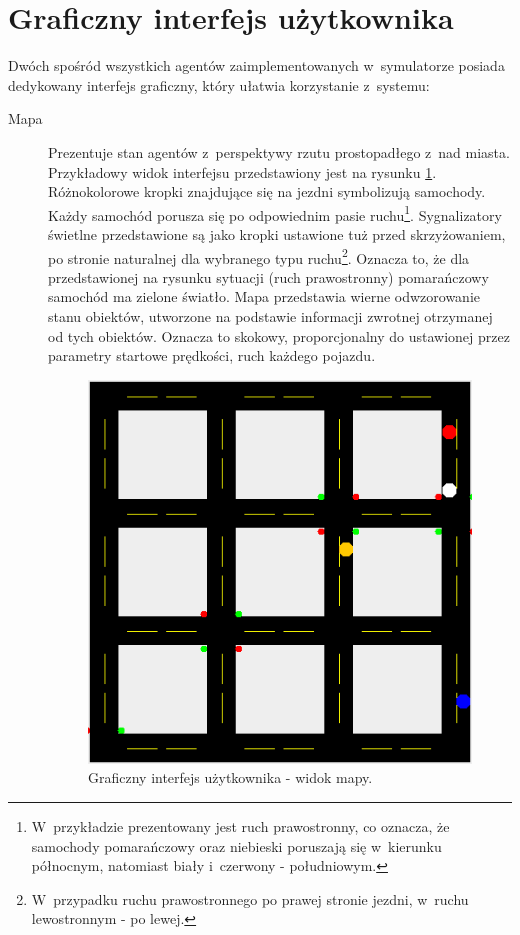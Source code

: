 \documentclass[a4paper,11pt]{article}
\begin{document}
\section{Graficzny interfejs użytkownika}

Dwóch spośród wszystkich agentów zaimplementowanych w~symulatorze posiada dedykowany interfejs graficzny, który ułatwia korzystanie z~systemu:

\begin{description}
    \item[Mapa] Prezentuje stan agentów z~perspektywy rzutu prostopadłego z~nad miasta. Przykładowy widok interfejsu przedstawiony jest na rysunku \ref{img:map}. Różnokolorowe kropki znajdujące się na jezdni symbolizują samochody. Każdy samochód porusza się po odpowiednim pasie ruchu\footnote{W~przykładzie prezentowany jest ruch prawostronny, co oznacza, że samochody pomarańczowy oraz niebieski poruszają się w~kierunku północnym, natomiast biały i~czerwony - południowym.}. Sygnalizatory świetlne przedstawione są jako kropki ustawione tuż przed skrzyżowaniem, po stronie naturalnej dla wybranego typu ruchu\footnote{W~przypadku ruchu prawostronnego po prawej stronie jezdni, w~ruchu lewostronnym - po lewej.}. Oznacza to, że dla przedstawionej na rysunku sytuacji (ruch prawostronny) pomarańczowy samochód ma zielone światło. Mapa przedstawia wierne odwzorowanie stanu obiektów, utworzone na podstawie informacji zwrotnej otrzymanej od tych obiektów. Oznacza to skokowy, proporcjonalny do ustawionej przez parametry startowe prędkości, ruch każdego pojazdu.
\begin{figure}[ht!]
    \centering
    \includegraphics[width=.95\textwidth]{gui_map.png}
    \caption{Graficzny interfejs użytkownika - widok mapy.}
    \label{img:map}
\end{figure}


\end{description}
\end{document}

